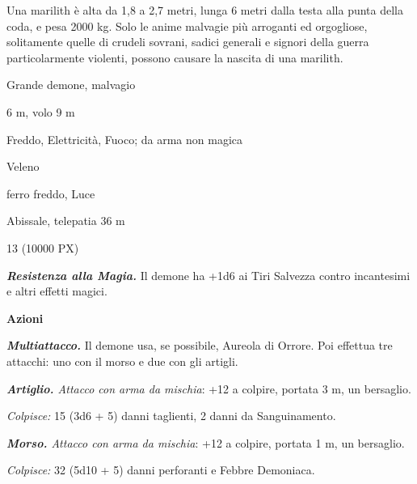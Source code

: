 \begin{multicols}{2}
{Una marilith è alta da 1,8 a 2,7 metri, lunga 6 metri dalla testa alla punta della coda, e pesa 2000 kg. Solo le anime malvagie più arroganti ed orgogliose, solitamente quelle di crudeli sovrani, sadici generali e signori della guerra particolarmente violenti, possono causare la nascita di una marilith.

\begin{description}[noitemsep, topsep=0pt, parsep=0pt, partopsep=0pt, itemsep=1pt, leftmargin=2.35cm,  labelwidth=2.2cm, itemindent=0cm, listparindent=0pt] %
\setlength{\baselineskip}{10pt}
\item[\textbf{Taglia/Tipo}] Grande demone, malvagio
\item[\textbf{Caratt.}] 
\item[\textbf{Punti Ferita}] 
\item[\textbf{Movimento}] 6 m, volo 9 m
\item[\textbf{Tiri Salvez.}] 
\item[\textbf{Res. Danni}] Freddo, Elettricità, Fuoco; da arma non magica
\item[\textbf{Imm. Danni}] Veleno
\item[\textbf{Vulnerabilità}] ferro freddo, Luce
\item[\textbf{Sensi}] 
\item[\textbf{Linguaggi}] Abissale, telepatia 36 m
\item[\textbf{Sfida}] 13 (10000 PX)
\end{description}
\smallskip

\emph{\textbf{Resistenza alla Magia.}} Il demone ha +1d6 ai Tiri Salvezza contro incantesimi e altri effetti magici.

\textbf{Azioni}

\emph{\textbf{Multiattacco.}} Il demone usa, se possibile, Aureola di Orrore. Poi effettua tre attacchi: uno con il morso e due con gli artigli.

\emph{\textbf{Artiglio.} Attacco con arma da mischia}: +12 a colpire, portata 3 m, un bersaglio.

\emph{Colpisce:} 15 (3d6 + 5) danni taglienti, 2 danni da Sanguinamento.

\emph{\textbf{Morso.} Attacco con arma da mischia}: +12 a colpire, portata 1 m, un bersaglio.

\emph{Colpisce:} 32 (5d10 + 5) danni perforanti e Febbre Demoniaca.

}
\end{multicols}
